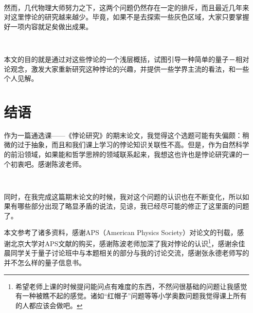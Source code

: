 \documentclass[aps,showpacs,twocolumn]{revtex4}%
\begin{document}
\ 

然而，几代物理大师努力之下，这两个问题仍然存在一定的排斥，而且最近几年来对这里悖论的研究越来越少。毕竟，如果不是去探索一些灰色区域，大家只要掌握好一项内容就足矣做出成果。

\ 

本文的目的就是通过对这些悖论的一个浅层概括，试图引导一种简单的量子－相对论观念，激发大家重新研究这种悖论的兴趣，并提供一些学界主流的看法，和一些个人见解。

\section{结语} 

作为一篇通选课——《悖论研究》的期末论文，我觉得这个选题可能有失偏颇：稍微的过于抽象，而且和我们课上学习的悖论知识关联性不高。但是，作为自然科学的前沿领域，如果能和哲学思辨的领域联系起来，我想这也许也是悖论研究课的一个初衷吧。感谢陈波老师。

\ 

同时，在我完成这篇期末论文的时候，我对这个问题的认识也在不断变化，所以如果有哪些部分出现了略显矛盾的说法，见谅，我已经尽可能的修正了这里面的问题了。

\begin{acknowledgments}
本文参考了诸多资料，感谢APS（American Physics Society）对论文的刊载，感谢北京大学对APS文献的购买，感谢陈波老师加深了我对悖论的认识\footnote{希望老师上课的时候提问能问点有难度的东西，不然问很基础的问题让我感觉有一种被瞧不起的感觉。诸如“红帽子”问题等等小学奥数问题我觉得课上所有的人都应该会做吧。}，感谢余佳晨同学关于量子讨论班中与本题相关的部分与我的讨论交流，感谢张永德老师写的并不怎么样的量子信息书。
\end{acknowledgments}

%

\end{document}
